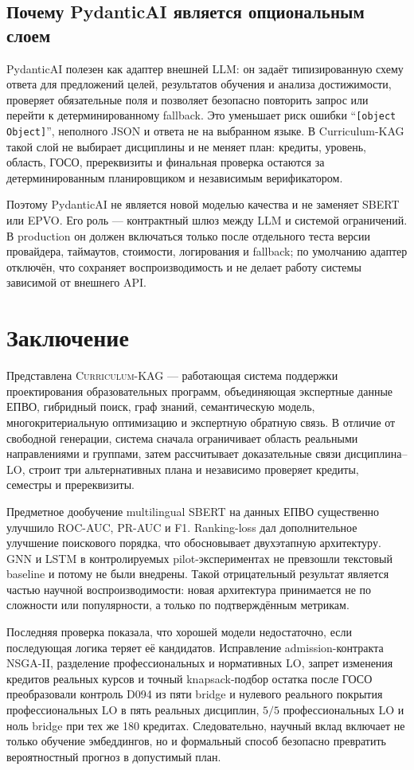 \documentclass[twoside,11pt]{article}
\newcommand{\systemname}{\textsc{Curriculum-KAG}}
\begin{document}
\subsection{Почему PydanticAI является опциональным слоем}

PydanticAI полезен как адаптер внешней LLM: он задаёт типизированную схему ответа для
предложений целей, результатов обучения и анализа достижимости, проверяет обязательные
поля и позволяет безопасно повторить запрос или перейти к детерминированному fallback.
Это уменьшает риск ошибки ``\texttt{[object Object]}'', неполного JSON и ответа не на
выбранном языке. В Curriculum-KAG такой слой не выбирает дисциплины и не меняет план:
кредиты, уровень, область, ГОСО, пререквизиты и финальная проверка остаются за
детерминированным планировщиком и независимым верификатором.

Поэтому PydanticAI не является новой моделью качества и не заменяет SBERT или EPVO.
Его роль — контрактный шлюз между LLM и системой ограничений. В production он должен
включаться только после отдельного теста версии провайдера, таймаутов, стоимости,
логирования и fallback; по умолчанию адаптер отключён, что сохраняет воспроизводимость
и не делает работу системы зависимой от внешнего API.

\section{Заключение}

Представлена \systemname{} --- работающая система поддержки проектирования образовательных программ, объединяющая экспертные данные ЕПВО, гибридный поиск, граф знаний, семантическую модель, многокритериальную оптимизацию и экспертную обратную связь. В отличие от свободной генерации, система сначала ограничивает область реальными направлениями и группами, затем рассчитывает доказательные связи дисциплина--LO, строит три альтернативных плана и независимо проверяет кредиты, семестры и пререквизиты.

Предметное дообучение multilingual SBERT на данных ЕПВО существенно улучшило ROC-AUC, PR-AUC и F1. Ranking-loss дал дополнительное улучшение поискового порядка, что обосновывает двухэтапную архитектуру. GNN и LSTM в контролируемых pilot-экспериментах не превзошли текстовый baseline и потому не были внедрены. Такой отрицательный результат является частью научной воспроизводимости: новая архитектура принимается не по сложности или популярности, а только по подтверждённым метрикам.

Последняя проверка показала, что хорошей модели недостаточно, если последующая
логика теряет её кандидатов. Исправление admission-контракта NSGA-II, разделение
профессиональных и нормативных LO, запрет изменения кредитов реальных курсов и
точный knapsack-подбор остатка после ГОСО преобразовали контроль D094 из пяти
bridge и нулевого реального покрытия профессиональных LO в пять реальных
дисциплин, $5/5$ профессиональных LO и ноль bridge при тех же 180 кредитах.
Следовательно, научный вклад включает не только обучение эмбеддингов, но и
формальный способ безопасно превратить вероятностный прогноз в допустимый план.
\end{document}
